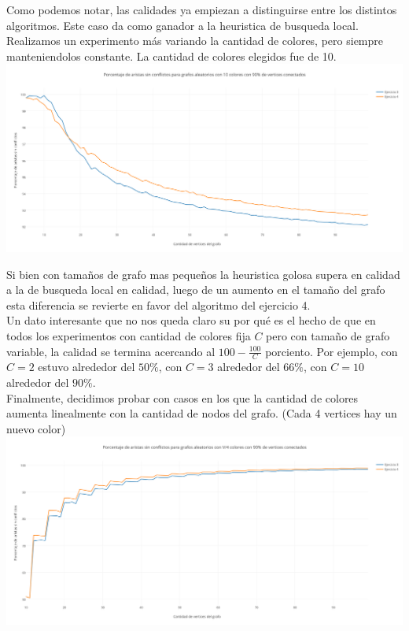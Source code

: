 Como podemos notar, las calidades ya empiezan a distinguirse entre los distintos algoritmos. Este caso da como ganador a la heuristica de busqueda local. \\

Realizamos un experimento más variando la cantidad de colores, pero siempre manteniendolos constante. La cantidad de colores elegidos fue de 10.\\

\includegraphics[scale=0.45]{./imagenes5/conf10.png}

Si bien con tamaños de grafo mas pequeños la heuristica golosa supera en calidad a la de busqueda local en calidad, luego de un aumento en el tamaño del grafo esta diferencia se revierte en favor del algoritmo del ejercicio 4. \\

Un dato interesante que no nos queda claro su por qué es el hecho de que en todos los experimentos con cantidad de colores fija $C$ pero con tamaño de grafo variable, la calidad se termina acercando al $100- \frac{100}{C}$ porciento. Por ejemplo, con $C=2$ estuvo alrededor del $50\%$, con $C=3$ alrededor del $66\%$, con $C=10$ alrededor del $90\%$. \\

Finalmente, decidimos probar con casos en los que la cantidad de colores aumenta linealmente con la cantidad de nodos del grafo. (Cada 4 vertices hay un nuevo color) \\

\includegraphics[scale=0.45]{./imagenes5/confv4.png}

